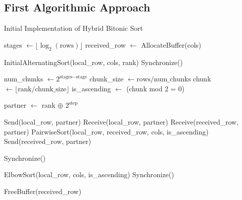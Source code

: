 \documentclass[12pt]{article}
\begin{document}
\subsection{First Algorithmic Approach}

\vspace{-10pt}

\begin{algorithm}
\caption{Initial Implementation of Hybrid Bitonic Sort}
\begin{algorithmic}[1]

\State stages $\gets \lfloor \log_2(\text{rows}) \rfloor$
\State received\_row $\gets$ AllocateBuffer(cols) 

\State InitialAlternatingSort(local\_row, cols, rank)
\State Synchronize() 

    \State num\_chunks $\gets 2^{\text{stages} - \text{stage}}$
    \State chunk\_size $\gets \text{rows} / \text{num\_chunks}$
    \State chunk $\gets \lfloor \text{rank} / \text{chunk\_size} \rfloor$
    \State is\_ascending $\gets$ (chunk mod 2 = 0)
    
        \State partner $\gets$ rank $\oplus$ $2^{\text{step}}$ 
        
            \State Send(local\_row, partner)  
            \State Receive(local\_row, partner)  
            \State Receive(received\_row, partner)  
            \State PairwiseSort(local\_row, received\_row, cols, is\_ascending)
            \State Send(received\_row, partner)  
        \EndIf
        
        \State Synchronize() 
    \EndFor
    
    \State ElbowSort(local\_row, cols, is\_ascending)
    \State Synchronize() 
\EndFor

\State FreeBuffer(received\_row)
\end{algorithmic}
\end{algorithm}
\end{document}
